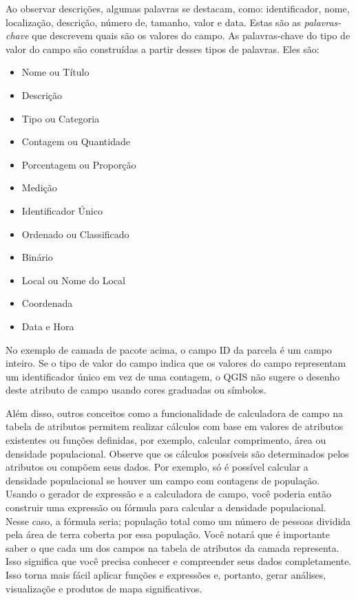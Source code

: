 \documentclass[
  portuguese,
]{krantz}
\providecommand{\tightlist}{%
  \setlength{\itemsep}{0pt}\setlength{\parskip}{0pt}}
\begin{document}
Ao observar descrições, algumas palavras se destacam, como: identificador, nome, localização, descrição, número de, tamanho, valor e data. Estas são as \emph{palavras-chave} que descrevem quais são os valores do campo. As palavras-chave do tipo de valor do campo são construídas a partir desses tipos de palavras. Eles são:

\begin{itemize}
\tightlist
\item
  Nome ou Título
\item
  Descrição
\item
  Tipo ou Categoria
\item
  Contagem ou Quantidade
\item
  Porcentagem ou Proporção
\item
  Medição
\item
  Identificador Único
\item
  Ordenado ou Classificado
\item
  Binário
\item
  Local ou Nome do Local
\item
  Coordenada
\item
  Data e Hora
\end{itemize}

No exemplo de camada de pacote acima, o campo ID da parcela é um campo inteiro. Se o tipo de valor do campo indica que os valores do campo representam um identificador único em vez de uma contagem, o QGIS não sugere o desenho deste atributo de campo usando cores graduadas ou símbolos.

Além disso, outros conceitos como a funcionalidade de calculadora de campo na tabela de atributos permitem realizar cálculos com base em valores de atributos existentes ou funções definidas, por exemplo, calcular comprimento, área ou densidade populacional. Observe que os cálculos possíveis são determinados pelos atributos ou compõem seus dados. Por exemplo, só é possível calcular a densidade populacional se houver um campo com contagens de população. Usando o gerador de expressão e a calculadora de campo, você poderia então construir uma expressão ou fórmula para calcular a densidade populacional. Nesse caso, a fórmula seria; população total como um número de pessoas dividida pela área de terra coberta por essa população. Você notará que é importante saber o que cada um dos campos na tabela de atributos da camada representa. Isso significa que você precisa conhecer e compreender seus dados completamente. Isso torna mais fácil aplicar funções e expressões e, portanto, gerar análises, visualizaçõe e produtos de mapa significativos.
\end{document}

